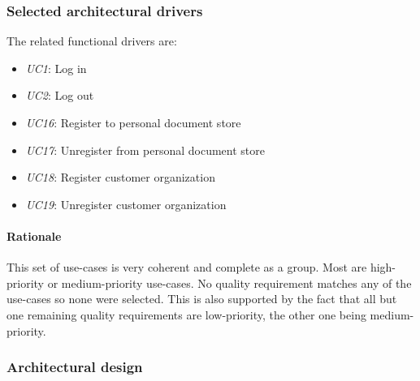 \documentclass[a4paper,10pt]{article}
\begin{document}
\subsubsection{Selected architectural drivers}

The related functional drivers are:

\begin{itemize}
    \item \emph{UC1}: Log in
    \item \emph{UC2}: Log out
    \item \emph{UC16}: Register to personal document store
    \item \emph{UC17}: Unregister from personal document store
    \item \emph{UC18}: Register customer organization
    \item \emph{UC19}: Unregister customer organization
\end{itemize}

\paragraph{Rationale}
This set of use-cases is very coherent and complete as a group. Most are high-priority or medium-priority use-cases. No quality requirement matches any of the use-cases so none were selected. This is also supported by the fact that all but one remaining quality requirements are low-priority, the other one being medium-priority.

\subsubsection{Architectural design}
\end{document}

